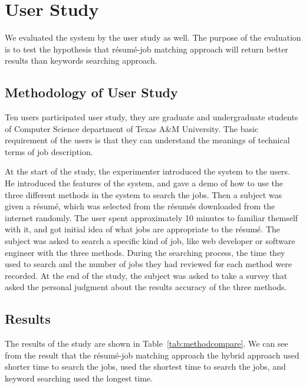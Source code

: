 
\section{User Study}

We evaluated the system by the user study as well. The purpose of the evaluation is to test the hypothesis that r\'esum\'e-job matching approach will return better results than keywords searching approach.

\subsection{Methodology of User Study}

Ten users participated user study, they are graduate and undergraduate students of Computer Science department of Texas A\&M University. The basic requirement of the users is that they can understand the meanings of technical terms of job description.

At the start of the study, the experimenter introduced the system to the users. He introduced the features of the system, and gave a demo of how to use the three different methods in the system to search the jobs. Then a subject was given a r\'esum\'e, which was selected from the r\'esum\'es downloaded from the internet randomly. The user spent approximately 10 minutes to familiar themself with it, and got initial idea of what jobs are appropriate to the r\'esum\'e. The subject was asked to search a specific kind of job, like web developer or software engineer with the three methods. During the searching process, the time they used to search and the number of jobs they had reviewed for each method were recorded.  At the end of the study, the subject was asked to take a survey that asked  the personal judgment about the results accuracy of the three methods.


\subsection{Results}

The results of the study are shown in Table~\ref{tab:methodcompare}. We can see from the result that the r\'esum\'e-job matching approach the hybrid approach used shorter time to search the jobs, used the shortest time to search the jobs, and keyword searching used the longest time.


